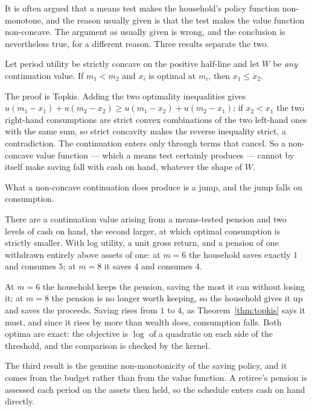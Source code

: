 It is often argued that a means test makes the household's policy function non-monotone, and the
reason usually given is that the test makes the value function non-concave. The argument as
usually given is wrong, and the conclusion is nevertheless true, for a different reason. Three
results separate the two.

\begin{theorem}\label{thm:topkis}
Let period utility be strictly concave on the positive half-line and let $W$ be \emph{any}
continuation value. If $m_1<m_2$ and $x_i$ is optimal at $m_i$, then $x_1\le x_2$.
\end{theorem}

The proof is Topkis. Adding the two optimality inequalities gives
$u(m_1-x_1)+u(m_2-x_2)\ge u(m_1-x_2)+u(m_2-x_1)$; if $x_2<x_1$ the two right-hand consumptions are
strict convex combinations of the two left-hand ones with the same sum, so strict concavity makes
the reverse inequality strict, a contradiction. The continuation enters only through terms that
cancel. So a non-concave value function --- which a means test certainly produces --- cannot by
itself make saving fall with cash on hand, whatever the shape of $W$.

What a non-concave continuation does produce is a jump, and the jump falls on consumption.

\begin{theorem}\label{thm:cons}
There are a continuation value arising from a means-tested pension and two levels of cash on hand,
the second larger, at which optimal consumption is strictly smaller. With log utility, a unit
gross return, and a pension of one withdrawn entirely above assets of one: at $m=6$ the household
saves exactly $1$ and consumes $5$; at $m=8$ it saves $4$ and consumes $4$.
\end{theorem}

At $m=6$ the household keeps the pension, saving the most it can without losing it; at $m=8$ the
pension is no longer worth keeping, so the household gives it up and saves the proceeds. Saving
rises from $1$ to $4$, as Theorem~\ref{thm:topkis} says it must, and since it rises by more than
wealth does, consumption falls. Both optima are exact: the objective is $\log$ of a quadratic on
each side of the threshold, and the comparison is checked by the kernel.

The third result is the genuine non-monotonicity of the saving policy, and it comes from the
budget rather than from the value function. A retiree's pension is assessed each period on the
assets then held, so the schedule enters cash on hand directly.

